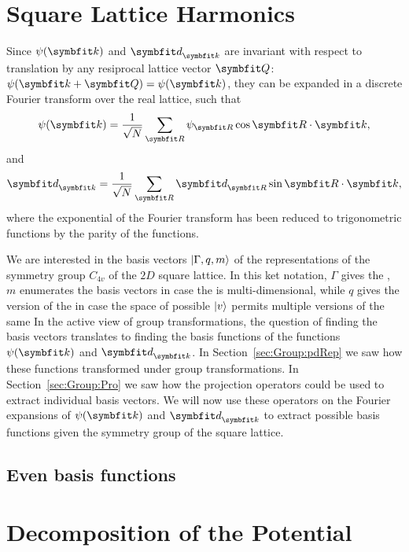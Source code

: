 \section{Square Lattice Harmonics}

Since $\psi(\v{k})$ and $\v{d}_\v{k}$ are invariant with respect to translation by any resiprocal lattice vector $\v{Q}$: $\psi(\v{k}+\v{Q}) = \psi(\v{k})$,
they can be expanded in a discrete Fourier transform over the real lattice, such that
\begin{equation}
    \label{eq:Group:SLH:psiFourier}
    \psi(\v{k}) = \frac{1}{\sqrt{N}}\sum_\v{R}\psi_\v{R}\cos\v{R}\cdot\v{k},
\end{equation}
and
\begin{equation}
    \label{eq:Group:SLH:dFourier}
    \v{d}_\v{k} = \frac{1}{\sqrt{N}}\sum_\v{R}\v{d}_\v{R}\sin\v{R}\cdot\v{k},
\end{equation}
where the exponential of the Fourier transform has been reduced to trigonometric functions by the parity of the functions.

We are interested in the basis vectors $\lvert \Gamma,q,m \rangle$ of the representations of the symmetry group $C_{4v}$ of the $2D$ square lattice. In this
ket notation, $\Gamma$ gives the \irr, $m$ enumerates the basis vectors in case the \irr is multi-dimensional, while $q$ gives the version of
the \irr in case the space of possible $\lvert v \rangle$ permits multiple versions of the same \irr In the active
view of group transformations, the question of finding the basis vectors translates to finding the basis functions of the functions $\psi(\v{k})$
and $\v{d}_\v{k}$. In Section~\ref{sec:Group:pdRep} we
saw how these functions transformed under group transformations. In Section~\ref{sec:Group:Pro} we saw how the projection operators could be used
to extract individual basis vectors. We will now use these operators on the Fourier expansions of $\psi(\v{k})$ and $\v{d}_\v{k}$ to extract possible
basis functions given the symmetry group of the square lattice.

\subsection{Even basis functions}

\section{Decomposition of the Potential}


